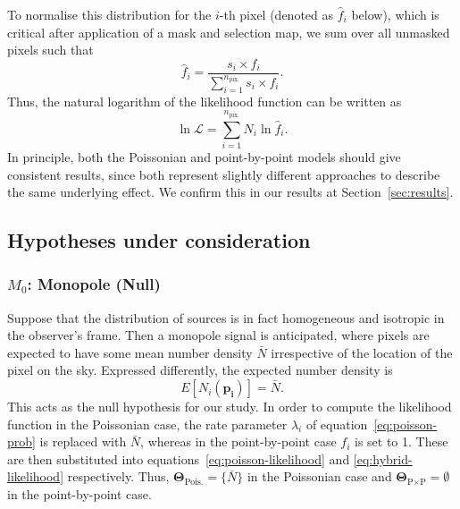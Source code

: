 \documentclass[fleqn,usenatbib]{mnras}
\begin{document}
                To normalise this distribution for the $i$-th pixel (denoted as $\hat{f}_i$ below), which is critical after application of a mask and selection map, we sum over all unmasked pixels such that
                \begin{equation}
                    \hat{f}_i = \frac{s_i \times f_i}{\sum_{i=1}^{n_{\text{pix.}}} s_i \times f_i}. \label{eq:hybrid-prob}
                \end{equation}
                Thus, the natural logarithm of the likelihood function can be written as
                \begin{equation}
                    \ln \mathcal{L} = \sum_{i=1}^{n_{\text{pix.}}} N_i \ln \hat{f}_i. \label{eq:hybrid-likelihood}
                \end{equation}
                In principle, both the Poissonian and point-by-point models should give consistent results, since both represent slightly different approaches to describe the same underlying effect.
                We confirm this in our results at Section~\ref{sec:results}.
    
    \subsection{Hypotheses under consideration}
    \label{sub:hypotheses-considered}
    \subsubsection{$M_0$: Monopole (Null)}
        Suppose that the distribution of sources is in fact homogeneous and isotropic in the observer's frame. 
        Then a monopole signal is anticipated, where pixels are expected to have some mean number density $\bar{N}$ irrespective of the location of the pixel on the sky.
        Expressed differently, the expected number density is
        \begin{equation}
            E [ N_i(\mathbf{\hat{p}_i}) ] = \bar{N}.
        \end{equation}
        This acts as the null hypothesis for our study.
        In order to compute the likelihood function in the Poissonian case, the rate parameter $\lambda_i$ of equation~\eqref{eq:poisson-prob} is replaced with $\bar{N}$, whereas in the point-by-point case $f_i$ is set to 1.
        These are then substituted into equations~\eqref{eq:poisson-likelihood} and \eqref{eq:hybrid-likelihood} respectively. 
        Thus, $\mathbf{\Theta}_{\text{Pois.}} = \{ \bar{N} \}$ in the Poissonian case and $\mathbf{\Theta}_{\text{P}\times\text{P}} = \emptyset$ in the point-by-point case.
\end{document}
